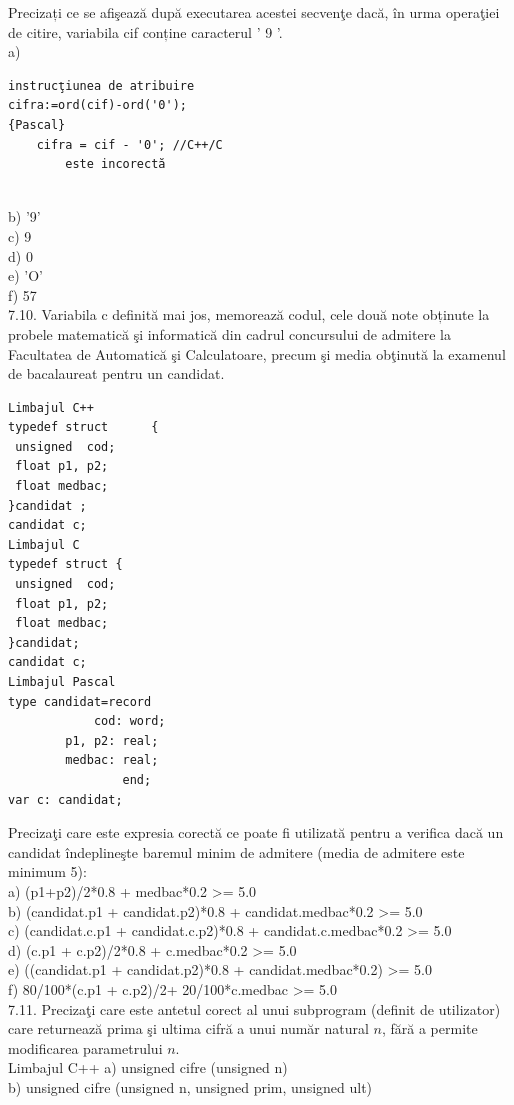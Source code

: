 Precizați ce se afişează după executarea acestei secvenţe dacă, în urma operaţiei de citire, variabila cif conține caracterul ' 9 '.
\\
a) \begin{verbatim}
instrucţiunea de atribuire
cifra:=ord(cif)-ord('0');
{Pascal}
    cifra = cif - '0'; //C++/C
        este incorectă
\end{verbatim}
\\
b) '9'
\\
c) 9
\\
d) 0
\\
e) 'O'
\\
f) 57
\\
7.10. Variabila c definită mai jos, memorează codul, cele două note obținute la probele matematică şi informatică din cadrul concursului de admitere la Facultatea de Automatică şi Calculatoare, precum şi media obţinută la examenul de bacalaureat pentru un candidat.
\begin{verbatim}
Limbajul C++
typedef struct      {  
 unsigned  cod; 
 float p1, p2;  
 float medbac; 
}candidat ; 
candidat c;
Limbajul C
typedef struct {  
 unsigned  cod; 
 float p1, p2;  
 float medbac; 
}candidat; 
candidat c;
Limbajul Pascal
type candidat=record
            cod: word;
        p1, p2: real;
        medbac: real;
                end;
var c: candidat;
\end{verbatim}
Precizaţi care este expresia corectă ce poate fi utilizată pentru a verifica dacă un candidat îndeplineşte baremul minim de admitere (media de admitere este minimum 5):
\\
a) (p1+p2)/2*0.8 + medbac*0.2 >= 5.0 
\\
b) (candidat.p1 + candidat.p2)*0.8 + candidat.medbac*0.2 >= 5.0 
\\
c) (candidat.c.p1 + candidat.c.p2)*0.8 + candidat.c.medbac*0.2 >= 5.0 
\\
d) (c.p1 + c.p2)/2*0.8 + c.medbac*0.2 >= 5.0 
\\
e) ((candidat.p1 + candidat.p2)*0.8 + candidat.medbac*0.2) >= 5.0 
\\
f) 80/100*(c.p1 + c.p2)/2+ 20/100*c.medbac >= 5.0
\\
7.11. Precizaţi care este antetul corect al unui subprogram (definit de utilizator) care returnează prima şi ultima cifră a unui număr natural $n$, fără a permite modificarea parametrului $n$.
\\
Limbajul C++
a) unsigned cifre (unsigned n)
\\
b) unsigned cifre (unsigned n, unsigned prim, unsigned ult)
